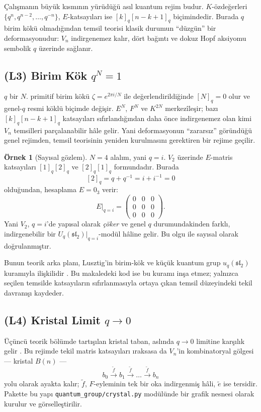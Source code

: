 \documentclass[10pt]{math}
\numberwithin{equation}{section}
\theoremstyle{plain}
\theoremstyle{definition}
\newtheorem{example}[theorem]{Örnek}
\renewcommand{\sl}{\mathfrak{sl}}
\newcommand{\Uq}{U_q(\sl_2)}
\newcommand{\qint}[1]{[#1]_q}
\begin{document}
Çalışmanın büyük kısmının yürüdüğü asıl kuantum rejim budur. $K$-özdeğerleri
$\{q^n, q^{n-2}, \dots, q^{-n}\}$, $E$-katsayıları ise $\qint{k}\qint{n-k+1}$
biçimindedir. Burada $q$ birim kökü olmadığından temsil teorisi klasik durumun
``düzgün'' bir deformasyonudur: $V_n$ indirgenemez kalır, dört bağıntı ve dokuz
Hopf aksiyomu sembolik $q$ üzerinde sağlanır.

\subsection{(L3) Birim Kök $q^N = 1$}

$q$ bir $N$. primitif birim kökü $\zeta = e^{2\pi i/N}$ ile değerlendirildiğinde
$\qint{N}=0$ olur ve genel-$q$ resmi köklü biçimde değişir. $E^N$, $F^N$ ve
$K^{2N}$ merkezîleşir; bazı $\qint{k}\qint{n-k+1}$ katsayıları sıfırlandığından
daha önce indirgenemez olan kimi $V_n$ temsilleri parçalanabilir hâle gelir.
Yani deformasyonun ``zararsız'' göründüğü genel rejimden, temsil teorisinin
yeniden kurulmasını gerektiren bir rejime geçilir.

\begin{example}[Sayısal gözlem]
$N = 4$ alalım, yani $q = i$. $V_2$ üzerinde $E$-matris katsayıları
$\qint{1}\qint{2}$ ve $\qint{2}\qint{1}$ formundadır. Burada
\[
  \qint{2} = q + q^{-1} = i + i^{-1} = 0
\]
olduğundan, hesaplama $E = 0_3$ verir:
\[
  E\big|_{q=i} = \begin{pmatrix} 0 & 0 & 0 \\ 0 & 0 & 0 \\ 0 & 0 & 0 \end{pmatrix}.
\]
Yani $V_2$, $q = i$'de yapısal olarak \emph{çöker} ve genel $q$
durumundakinden farklı, indirgenebilir bir $\Uq|_{q=i}$-modül hâline
gelir. Bu olgu 
ile sayısal olarak doğrulanmıştır.
\end{example}

Bunun teorik arka planı, Lusztig'in birim-kök ve küçük kuantum grup
$u_q(\sl_2)$ kuramıyla ilişkilidir \cite{Lusztig}. Bu makaledeki kod ise bu
kuramı inşa etmez; yalnızca seçilen temsilde katsayıların sıfırlanmasıyla ortaya
çıkan temsil düzeyindeki tekil davranışı kaydeder.

\subsection{(L4) Kristal Limit $q \to 0$}

Üçüncü teorik bölümde tartışılan kristal taban, aslında $q\to 0$ limitine
karşılık gelir \cite{Kashiwara,HK}. Bu rejimde tekil matris katsayıları ıraksasa da $V_n$'in
kombinatoryal gölgesi --- kristal $B(n)$ ---
\[
  b_0 \xrightarrow{\tilde f} b_1 \xrightarrow{\tilde f} \dots
   \xrightarrow{\tilde f} b_n
\]
yolu olarak ayakta kalır; $\tilde f$, $F$-eyleminin tek bir oka indirgenmiş
hâli, $\tilde e$ ise tersidir. Pakette bu yapı \texttt{quantum\_group/crystal.py}
modülünde bir grafik nesnesi olarak kurulur ve görselleştirilir.
\end{document}

